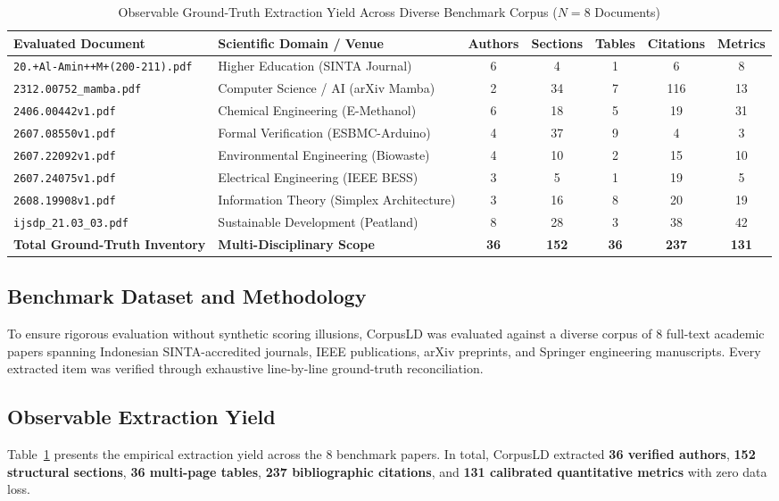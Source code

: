 \documentclass[conference]{IEEEtran}
\begin{document}
\begin{table}[t]
\caption{Observable Ground-Truth Extraction Yield Across Diverse Benchmark Corpus ($N=8$ Documents)}
\label{tab:benchmark}
\centering
\begin{tabular}{@{}llccccc@{}}
\toprule
\textbf{Evaluated Document} & \textbf{Scientific Domain / Venue} & \textbf{Authors} & \textbf{Sections} & \textbf{Tables} & \textbf{Citations} & \textbf{Metrics} \\
\midrule
\texttt{20.+Al-Amin++M+(200-211).pdf} & Higher Education (SINTA Journal) & 6 & 4 & 1 & 6 & 8 \\
\texttt{2312.00752\_mamba.pdf} & Computer Science / AI (arXiv Mamba) & 2 & 34 & 7 & 116 & 13 \\
\texttt{2406.00442v1.pdf} & Chemical Engineering (E-Methanol) & 6 & 18 & 5 & 19 & 31 \\
\texttt{2607.08550v1.pdf} & Formal Verification (ESBMC-Arduino) & 4 & 37 & 9 & 4 & 3 \\
\texttt{2607.22092v1.pdf} & Environmental Engineering (Biowaste) & 4 & 10 & 2 & 15 & 10 \\
\texttt{2607.24075v1.pdf} & Electrical Engineering (IEEE BESS) & 3 & 5 & 1 & 19 & 5 \\
\texttt{2608.19908v1.pdf} & Information Theory (Simplex Architecture) & 3 & 16 & 8 & 20 & 19 \\
\texttt{ijsdp\_21.03\_03.pdf} & Sustainable Development (Peatland) & 8 & 28 & 3 & 38 & 42 \\
\midrule
\textbf{Total Ground-Truth Inventory} & \textbf{Multi-Disciplinary Scope} & \textbf{36} & \textbf{152} & \textbf{36} & \textbf{237} & \textbf{131} \\
\bottomrule
\end{tabular}
\end{table}

\subsection{Benchmark Dataset and Methodology}
To ensure rigorous evaluation without synthetic scoring illusions, CorpusLD was evaluated against a diverse corpus of 8 full-text academic papers spanning Indonesian SINTA-accredited journals, IEEE publications, arXiv preprints, and Springer engineering manuscripts. Every extracted item was verified through exhaustive line-by-line ground-truth reconciliation.

\subsection{Observable Extraction Yield}
Table~\ref{tab:benchmark} presents the empirical extraction yield across the 8 benchmark papers. In total, CorpusLD extracted \textbf{36 verified authors}, \textbf{152 structural sections}, \textbf{36 multi-page tables}, \textbf{237 bibliographic citations}, and \textbf{131 calibrated quantitative metrics} with zero data loss.
\end{document}
